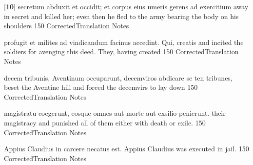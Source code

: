 \latline
  {[\textbf{10}] secretum abduxit et occidit; et corpus eius umeris gerens ad exercitium }
  { away in secret and killed her; even then he fled to the army bearing the body on his shoulders }
  {150}
  { CorrectedTranslation }
  { Notes }


\latline
  {profugit et milites ad vindicandum facinus accedint.  Qui, creatis}
  { and incited the soldiers for avenging this deed.  They, having created  }
  {150}
  { CorrectedTranslation }
  { Notes }


\latline
  {decem tribunis, Aventinum occuparunt, decemviros abdicare se}
  { ten tribunes, beset the Aventine hill and forced the decemvirs to lay down }
  {150}
  { CorrectedTranslation }
  { Notes }


\latline
  {magistratu coegerunt, eosque omnes aut morte aut exsilio penierunt.}
  { their magistracy and punished all of them either with death or exile. }
  {150}
  { CorrectedTranslation }
  { Notes }


\latline
  {Appius Claudius in carcere necatus est.}
  { Appius Claudius was executed in jail. }
  {150}
  { CorrectedTranslation }
  { Notes }




